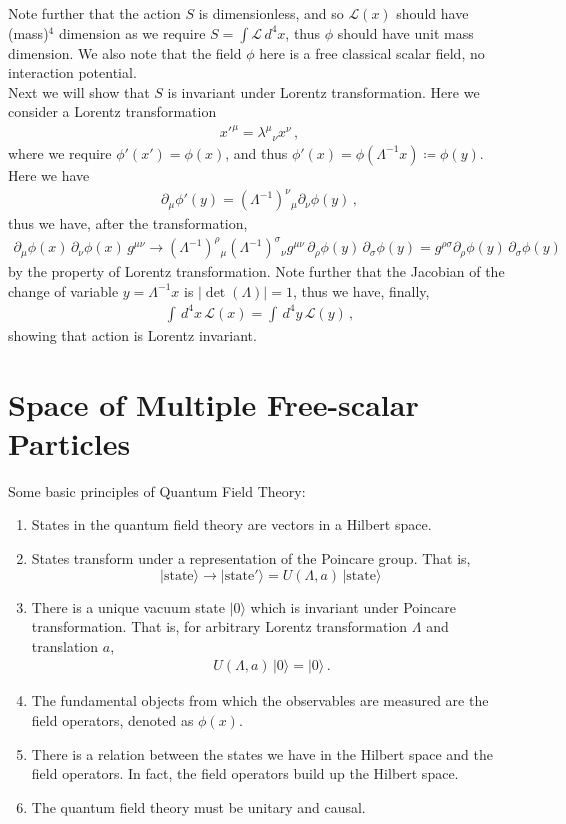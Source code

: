 \documentclass[11pt, onesided]{book}
\theoremstyle{break}
\theoremstyle{break}
\newcommand{\pd}{\partial}
\begin{document}
Note further that the action $S$ is dimensionless, and so $\mathcal{L}(x)$ should have (mass)$^4$ dimension as we require $S = \int \mathcal{L}\, d^4x$, thus $\phi$ should have unit mass dimension. We also note that the field $\phi$ here is a free classical scalar field, no interaction potential. \\

Next we will show that $S$ is invariant under Lorentz transformation. Here we consider a Lorentz transformation
\begin{align*}
x'^\mu = \lambda^\mu{}_\nu x^\nu\,,
\end{align*}
where we require $\phi'(x') = \phi(x)$, and thus $\phi'(x) = \phi(\Lambda^{-1} x) \coloneqq \phi(y)$. Here we have
\begin{align*}
\pd_\mu \phi'(y) = (\Lambda^{-1})^\nu{}_\mu \pd_\nu \phi(y)\,,
\end{align*}
thus we have, after the transformation,
\begin{align*}
\pd_\mu \phi(x) \, \pd_\nu\phi(x) \, g^{\mu\nu} \to (\Lambda^{-1})^\rho{}_\mu (\Lambda^{-1})^{\sigma}{}_{\nu} g^{\mu \nu} \, \pd_\rho \phi(y) \, \pd_\sigma\phi(y) = g^{\rho \sigma} \pd_\rho \phi(y) \, \pd_\sigma \phi(y)\, 
\end{align*}
by the property of Lorentz transformation. Note further that the Jacobian of the change of variable $y = \Lambda^{-1}x$ is $|\det(\Lambda)| = 1$, thus we have, finally,
\begin{align*}
\int\, d^4 x \, \mathcal{L}(x) = \int\, d^4y \, \mathcal{L}(y)\,,
\end{align*}
showing that action is Lorentz invariant. 

\section[Space of Multiple Free-scalar Particles]{\color{red}Space of Multiple Free-scalar Particles\color{black}}
Some basic principles of Quantum Field Theory:
\begin{enumerate}
\item States in the quantum field theory are vectors in a Hilbert space.
\item States transform under a representation of the Poincare group. That is, $$|\text{state}\rangle \to |\text{state}'\rangle = U(\Lambda, a) \, |\text{state}\rangle\,$$
\item There is a unique vacuum state $|0\rangle$ which is invariant under Poincare transformation. That is, for arbitrary Lorentz transformation $\Lambda$ and translation $a$,
\begin{align*}
U(\Lambda, a)\, |0\rangle = |0\rangle\,.
\end{align*}
\item The fundamental objects from which the observables are measured are the field operators, denoted as $\phi(x)$. 
\item There is a relation between the states we have in the Hilbert space and the field operators. In fact, the field operators build up the Hilbert space. 
\item The quantum field theory must be unitary and causal. 
\end{enumerate}
\end{document}
